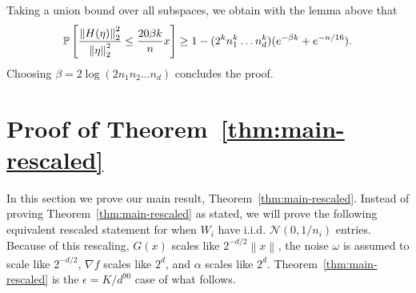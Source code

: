 \documentclass[11pt]{article}
\newcommand{\Tnorm}{}
\newcommand\norm[2][\Tnorm]{\ensuremath{{\left\|#2\right\|}_{#1}}}
\newcommand\Tex{}
\newcommand\PR[2][\Tex]{
\ifthenelse{\equal{#1}{}}{{\mathbb P}\left[#2\right]}{\ensuremath{{\mathbb P}_{#1}\left[ #2\right]}}}
\newcommand{\PS}{P_S}
\newcommand{\PSc}{P_{S^c}}
\begin{document}

Taking a union bound over all subspaces, we obtain with the lemma above that
\[
\PR{ \frac{\norm[2]{H(\eta)}^2}{\norm[2]{ \eta}^2}
\leq 
\frac{20 \beta k}{n}x
}
\geq
1 - (2^k n_1^k \ldots n_d^k) (e^{-\beta k} + e^{-n/16}).
\]
Choosing $\beta = 2 \log(2n_1 n_2 \ldots n_d)$ concludes the proof.






\section{Proof of Theorem~\ref{thm:main-rescaled}} \label{sec:proofs}

In this section we prove our main result, Theorem~\ref{thm:main-rescaled}.   Instead of proving Theorem~\ref{thm:main-rescaled} as stated, we will prove the following equivalent rescaled statement for when $W_i$ have i.i.d. $\mathcal{N}(0, 1/{n_i})$ entries.  Because of this rescaling, $G(x)$ scales like $2^{-d/2} \norm{x}$, the noise $\omega$ is assumed to scale like $2^{-d/2}$, $\nabla f$ scales like $2^d$, and $\alpha$ scales like $2^d$.  Theorem~\ref{thm:main-rescaled} is the $\epsilon=K/d^{90}$ case of what follows.  
\end{document}
